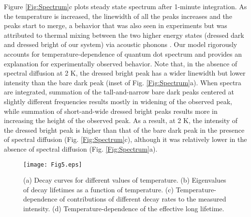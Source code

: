 \documentclass[aps,pra,preprint,groupedaddress]{revtex4-1}
\begin{document}
Figure \ref{Fig:Spectrum}c plots steady state spectrum after 1-minute integration. As the temperature is increased, the linewidth of all the peaks increases and the peaks start to merge, a behavior that was also seen in experiments but was attributed to thermal mixing between the two higher energy states (dressed dark and dressed bright of our system) via acoustic phonons \cite{Biadala2009}. Our model rigorously accounts for temperature-dependence of quantum dot spectrum and provides an explanation for experimentally observed behavior. Note that, in the absence of spectral diffusion at 2 K, the dressed bright peak has a wider linewidth but lower intensity than the bare dark peak (inset of Fig. \ref{Fig:Spectrum}a). When spectra are integrated, summation of the tall-and-narrow bare dark peaks centered at slightly different frequencies results mostly in widening of the observed peak, while summation of short-and-wide dressed bright peaks results more in increasing the height of the observed peak. As a result, at 2 K, the intensity of the dressed bright peak is higher than that of the bare dark peak in the presence of spectral diffusion (Fig. \ref{Fig:Spectrum}c), although it was relatively lower in the absence of spectral diffusion (Fig. \ref{Fig:Spectrum}a).  

\begin{figure}[htbp]
\texttt{[image: Fig5.eps]}
\caption{(a) Decay curves for different values of temperature. (b) Eigenvalues of decay lifetimes as a function of temperature. (c) Temperature-dependence of contributions of different decay rates to the measured intensity. (d) Temperature-dependence of the effective long lifetime.}
\label{Fig:Lifetime}
\end{figure}
\end{document}
